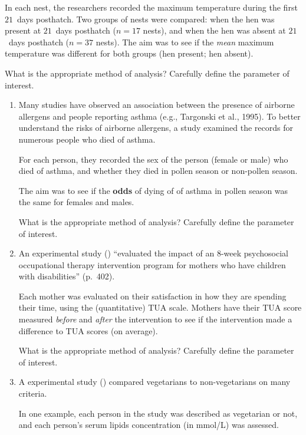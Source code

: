 \documentclass[
  11pt,
  a4paper,
  krantz2]{krantz}
\newlength{\greyboxheight}
\newcommand{\setgreyboxheight}[1]{%
  \setlength{\greyboxheight}{2.3\baselineskip * #1}%
}
\newenvironment{greybox}[1]{%
  \nopagebreak
  \setgreyboxheight{#1}%
  \begin{tcolorbox}[
    colframe=gray!30!black,
    boxrule=2pt,
    width=\linewidth,
    height=\greyboxheight,
    valign=center,
    colback=white,
    left=4pt,
    right=4pt, 
    top=4pt, 
    bottom=4pt,
    before skip=4pt,
    after skip=4pt
  ]
\vspace*{\greyboxheight} %
}{%
  \end{tcolorbox}
  \goodbreak
}
\newcommand{\answerbox}[1]{\noindent\begin{greybox}{#1}\end{greybox}}
\begin{document}
In each nest, the researchers recorded the maximum temperature during the first \(21\)~days posthatch.
Two groups of nests were compared: when the hen was present at \(21\)~days posthatch (\(n = 17\) nests), and when the hen was absent at \(21\)~days posthatch (\(n = 37\) nests).
The aim was to see if the \emph{mean} maximum temperature was different for both groups (hen present; hen absent).

What is the appropriate method of analysis?
Carefully define the parameter of interest.
\answerbox{2}

\begin{enumerate}
\def\labelenumi{\arabic{enumi}.}
\setcounter{enumi}{1}
\item
  Many studies have observed an association between the presence of airborne allergens and people reporting asthma (e.g., Targonski et al., 1995). To better understand the risks of airborne allergens, a study examined the records for numerous people who died of asthma.

  For each person, they recorded the sex of the person (female or male) who died of asthma, and whether they died in pollen season or non-pollen season.

  The aim was to see if the \textbf{odds} of dying of of asthma in pollen season was the same for females and males.

  What is the appropriate method of analysis?
  Carefully define the parameter of interest.
  \answerbox{2}
\item
  An experimental study () ``evaluated the impact of an 8-week psychosocial occupational therapy intervention program for mothers who have children with disabilities'' (p.~402).

  Each mother was evaluated on their satisfaction in how they are spending their time, using the (quantitative) TUA scale.
  Mothers have their TUA score measured \emph{before} and \emph{after} the intervention to see if the intervention made a difference to TUA scores (on average).

  What is the appropriate method of analysis?
  Carefully define the parameter of interest.
  \answerbox{2}
\item
  A experimental study () compared vegetarians to non-vegetarians on many criteria.

  In one example, each person in the study was described as vegetarian or not, and each person's serum lipids concentration (in mmol/L) was assessed.


\end{enumerate}
\end{document}
